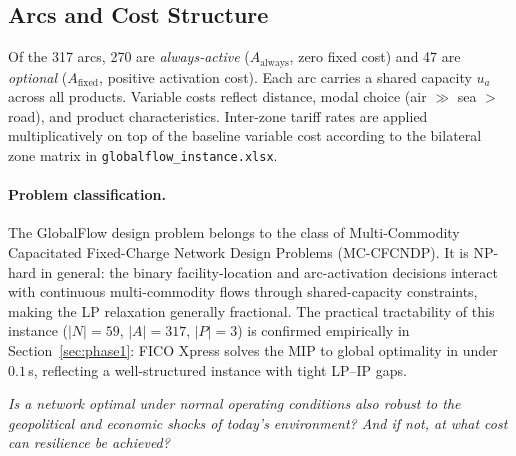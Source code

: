 \subsection*{Arcs and Cost Structure}

Of the 317 arcs, 270 are \textit{always-active} ($A_{\text{always}}$, zero
fixed cost) and 47 are \textit{optional} ($A_{\text{fixed}}$, positive
activation cost). Each arc carries a shared capacity $u_a$ across all products.
Variable costs reflect distance, modal choice (air $\gg$ sea $>$ road), and
product characteristics. Inter-zone tariff rates are applied multiplicatively
on top of the baseline variable cost according to the bilateral zone matrix in
\texttt{globalflow\_instance.xlsx}.

\paragraph*{Problem classification.}
The GlobalFlow design problem belongs to the class of
Multi-Commodity Capacitated Fixed-Charge Network Design Problems (MC-CFCNDP).
It is NP-hard in general: the binary facility-location
and arc-activation decisions interact with continuous multi-commodity
flows through shared-capacity constraints, making the LP relaxation
generally fractional.
The practical tractability of this instance ($|N|=59$, $|A|=317$,
$|P|=3$) is confirmed empirically in Section~\ref{sec:phase1}:
FICO Xpress solves the MIP to global optimality in under $0.1$\,s,
reflecting a well-structured instance with tight LP–IP gaps.

\begin{tcolorbox}[questionbox, title={Central Question}]
\small\itshape
Is a network optimal under normal operating conditions also robust to the
geopolitical and economic shocks of today's environment?
And if not, at what cost can resilience be achieved?
\end{tcolorbox}
